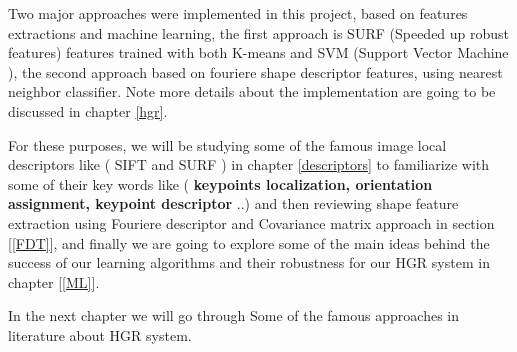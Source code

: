 Two major approaches were implemented in this project,  based on features extractions and machine learning, the first approach  is SURF (Speeded up robust features) features trained with both K-means and SVM (Support Vector Machine ), the second approach  based on fouriere  shape descriptor  features, using nearest neighbor classifier. Note more details about the implementation are going to be discussed in chapter \ref{hgr}.

For these purposes, we will be studying  some of the famous image local descriptors like ( SIFT and SURF )  in chapter  \ref{descriptors}   to familiarize with some of their key words like ( \textbf{keypoints localization, orientation assignment, keypoint descriptor} ..)  and  then  reviewing shape feature extraction using Fouriere descriptor and Covariance matrix approach in  section [\ref{FDT}], and finally we are going to explore  some of the main ideas behind the success of our learning algorithms and their robustness for our HGR system  in chapter [\ref{ML}].

In the next chapter we will go through Some of the famous approaches in  literature about HGR  system.




